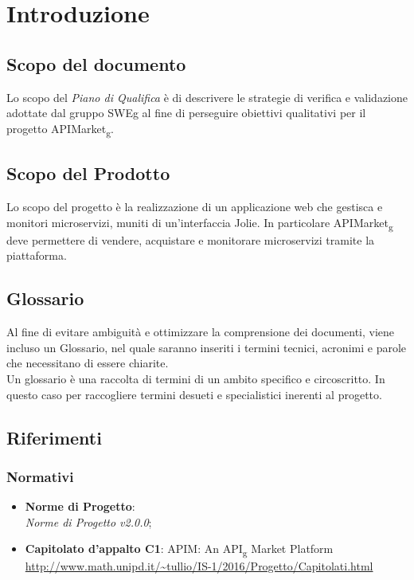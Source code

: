 \documentclass[12pt,a4paper,titlepage]{article}
\begin{document}
	\newpage
	
	\tableofcontents
	\thispagestyle{empty}
	
	\newpage

	\section{Introduzione}
	\subsection{Scopo del documento}
	Lo scopo del \textit{Piano di Qualifica} è di descrivere le strategie di verifica e validazione adottate dal gruppo SWEg al fine di perseguire obiettivi qualitativi per il progetto APIMarket\textsubscript{g}.
	
	\subsection{Scopo del Prodotto}
	Lo scopo del progetto è la realizzazione di un applicazione web che gestisca e monitori microservizi, muniti di un'interfaccia Jolie. In particolare APIMarket\textsubscript{g} deve permettere di vendere, acquistare e monitorare microservizi tramite la piattaforma.
	
	\subsection{Glossario}
	Al fine di evitare ambiguità e ottimizzare la comprensione dei documenti, viene incluso un Glossario, nel quale saranno inseriti i termini tecnici, acronimi e parole che necessitano di essere chiarite.\\
	Un glossario è una raccolta di termini di un ambito specifico e circoscritto. In questo caso per raccogliere termini desueti e specialistici inerenti al progetto.
	
	\subsection{Riferimenti}
	\subsubsection{Normativi}
	\begin{itemize}
		\item \textbf{Norme di Progetto}:\\
		\textit{Norme di Progetto v2.0.0};
		\item \textbf{Capitolato d'appalto C1}: APIM: An API\textsubscript{g} Market Platform\\
			\textcolor{blue}{\url{http://www.math.unipd.it/~tullio/IS-1/2016/Progetto/Capitolati.html}}
	\end{itemize}
\end{document}
